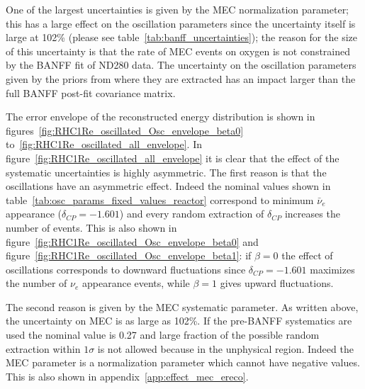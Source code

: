 One of the largest uncertainties is given by the MEC normalization parameter; this has a large 
effect on the oscillation parameters since the uncertainty itself is large at 102\% (please see table~\ref{tab:banff_uncertainties}); the reason 
for the size of this uncertainty is that the rate of MEC events on oxygen is not constrained by the BANFF fit of ND280 data.
The uncertainty on the oscillation parameters given by the priors from where they are extracted has an impact larger than
the full BANFF post-fit covariance matrix.









The error envelope of the reconstructed energy distribution is shown in
figures~\ref{fig:RHC1Re_oscillated_Osc_envelope_beta0} 
to~\ref{fig:RHC1Re_oscillated_all_envelope}.
In figure~\ref{fig:RHC1Re_oscillated_all_envelope} it is clear that the effect of the 
systematic uncertainties is highly asymmetric.
The first reason is that the oscillations have an asymmetric effect.
Indeed the nominal values shown in table~\ref{tab:osc_params_fixed_values_reactor}
correspond to minimum $\bar{\nu}_e$ appearance ($\delta_{CP} = -1.601$)
and every random extraction of $\delta_{CP}$ increases the number of events.
This is also shown in figure~\ref{fig:RHC1Re_oscillated_Osc_envelope_beta0} and
figure~\ref{fig:RHC1Re_oscillated_Osc_envelope_beta1}:
if $\beta=0$ the effect of oscillations corresponds to downward fluctuations since 
$\delta_{CP} = -1.601$ maximizes the number of $\nu_e$ appearance events,
while $\beta=1$ gives upward fluctuations.

The second reason is given by the MEC systematic parameter.
As written above, the uncertainty on MEC is as large as 102\%.
If the pre-BANFF systematics are used the nominal value is 0.27
and large fraction of the possible random extraction within $1\sigma$ 
is not allowed because in the unphysical region. 
Indeed the MEC parameter is a normalization parameter which cannot
have negative values. 
This is also shown in appendix~\ref{app:effect_mec_ereco}.


